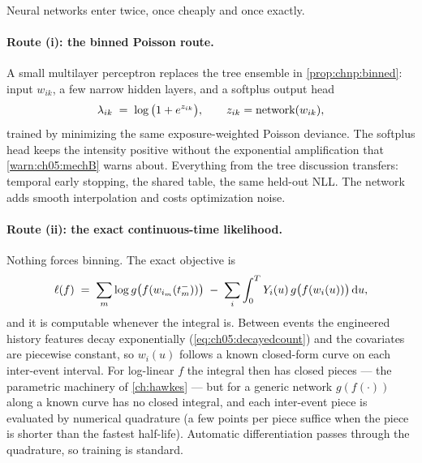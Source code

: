 Neural networks enter twice, once cheaply and once exactly.

\paragraph{Route (i): the binned Poisson route.}
A small multilayer perceptron replaces the tree ensemble in
\cref{prop:chnp:binned}: input $w_{ik}$, a few narrow hidden layers,
and a softplus output head
\begin{equation}\label{eq:chnp:softplus}
\lambda_{ik} \;=\; \log\big(1 + e^{z_{ik}}\big),
\qquad z_{ik} = \text{network}(w_{ik}),
\end{equation}
trained by minimizing the same exposure-weighted Poisson deviance. The
softplus head keeps the intensity positive without the exponential
amplification that \cref{warn:ch05:mechB} warns about. Everything from
the tree discussion transfers: temporal early stopping, the shared
table, the same held-out NLL. The network adds smooth interpolation and
costs optimization noise.

\paragraph{Route (ii): the exact continuous-time likelihood.}
Nothing forces binning. The exact objective is
\begin{equation}\label{eq:chnp:exactll}
\ell(f)
 \;=\;
 \sum_{m} \log g\big(f(w_{i_m}(t_m^-))\big)
 \;-\;
 \sum_{i} \int_0^{T} Y_i(u)\,
 g\big(f(w_i(u))\big) \,\mathrm{d} u ,
\end{equation}
and it is computable whenever the integral is. Between events the
engineered history features decay exponentially
(\cref{eq:ch05:decayedcount}) and the covariates are piecewise constant,
so $w_i(u)$ follows a known closed-form curve on each inter-event
interval. For log-linear $f$ the integral then has closed pieces --- the
parametric machinery of \cref{ch:hawkes} --- but for a generic network
$g(f(\cdot))$ along a known curve has no closed integral, and each
inter-event piece is evaluated by numerical quadrature (a few points per
piece suffice when the piece is shorter than the fastest half-life).
Automatic differentiation passes through the quadrature, so training is
standard.

